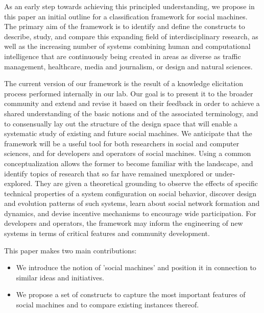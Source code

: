\documentclass{sig-alternate}
\begin{document}
As an early step towards achieving this principled understanding, we propose in this paper an initial outline for a classification framework for social machines. The primary aim of the framework is to identify and define the constructs to describe, study, and compare this expanding field of interdisciplinary research, as well as the increasing number of systems combining human and computational intelligence that are continuously being created in areas as diverse as traffic management, healthcare, media and journalism, or design and natural sciences.

The current version of our framework is the result of a knowledge elicitation process performed internally in our lab. Our goal is to present it to the broader community and extend and revise it based on their feedback in order to achieve a shared understanding of the basic notions and of the associated terminology, and to consensually lay out the structure of the design space that will enable a systematic study of existing and future social machines. We anticipate that the framework will be a useful tool for both researchers in social and computer sciences, and for developers and operators of social machines. Using a common conceptualization allows the former to become familiar with the landscape, and identify topics of research that so far have remained unexplored or under-explored. They are given a theoretical grounding to observe the effects of specific technical properties of a system configuration on social behavior, discover design and evolution patterns of such systems, learn about social network formation and dynamics, and devise incentive mechanisms to encourage wide participation. For developers and operators, the framework may inform the engineering of new systems in terms of critical features and community development.

This paper makes two main contributions:

\begin{itemize}
  \item We introduce the notion of 'social machines' and position it in connection to similar ideas and initiatives.
  \item We propose a set of constructs to capture the most important features of social machines and to compare existing instances thereof.
\end{itemize}
\end{document}
